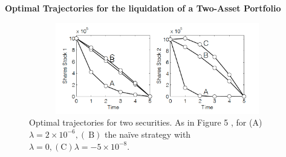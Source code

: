\documentclass[10pt]{article}
\begin{document}
\textbf{Optimal Trajectories for the liquidation of a Two-Asset Portfolio}

\begin{center} 
    \begin{figure}[hbt!]
        \captionsetup{justification=centering,margin=0.5cm}
        \includegraphics[width=13cm,height=4cm,keepaspectratio,]{op2.png}
        \centering
        \caption[caption]{Optimal trajectories for two securities. As in Figure 5 , for (A) $\lambda=2 \times 10^{-6},(\mathrm{~B})$ the naïve strategy with $\lambda=0,(\mathrm{C}) \lambda=-5 \times 10^{-8}$.
        \cite[p.41]{Almgren_optimalexecution}}
    \end{figure}
\end{center}

           

\end{document}
